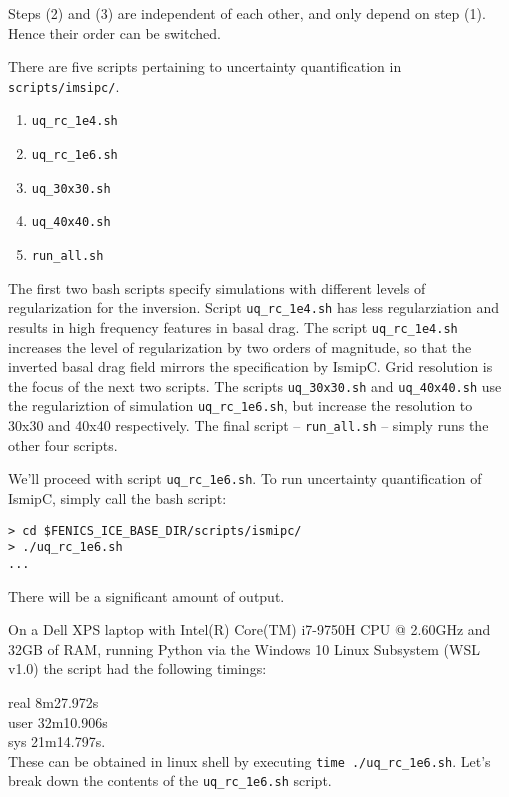 \documentclass[11pt, reqno, nocenter]{article}
\begin{document}
Steps (2) and (3) are independent of each other, and only depend on step (1). Hence their order can be switched.

There are five scripts pertaining to uncertainty quantification in {\tt scripts/imsipc/}.
\begin{enumerate}
	\item {\tt uq\_rc\_1e4.sh  }
	\item {\tt uq\_rc\_1e6.sh}
	\item {\tt uq\_30x30.sh  }
	\item {\tt uq\_40x40.sh  }
	\item {\tt run\_all.sh}  
\end{enumerate}

The first two bash scripts specify simulations with different levels of regularization for the inversion. Script {\tt uq\_rc\_1e4.sh} has less regularziation and results in high frequency features in basal drag. The script {\tt uq\_rc\_1e4.sh} increases the level of regularization by two orders of magnitude, so that the inverted basal drag field mirrors the specification by IsmipC. Grid resolution is the focus of the next two scripts. The scripts {\tt uq\_30x30.sh} and {\tt uq\_40x40.sh} use the regulariztion of simulation {\tt uq\_rc\_1e6.sh}, but increase the resolution to 30x30 and 40x40 respectively. The final script -- {\tt run\_all.sh}  -- simply runs the other four scripts.

We'll proceed with script {\tt uq\_rc\_1e6.sh}. To run uncertainty quantification of IsmipC, simply call the bash script:
\begin{verbatim}
> cd $FENICS_ICE_BASE_DIR/scripts/ismipc/
> ./uq_rc_1e6.sh
...
\end{verbatim}

There will be a significant amount of output. 

On a Dell XPS laptop with Intel(R) Core(TM) i7-9750H CPU @ 2.60GHz and 32GB of RAM, running Python via the Windows 10 Linux Subsystem (WSL v1.0) the script had the following timings:   

real	\hspace{10mm} 8m27.972s \\
user  \hspace{9mm}  32m10.906s \\
sys    \hspace{11mm} 21m14.797s. \\

These can be obtained in linux shell by executing {\tt time ./uq\_rc\_1e6.sh}. Let's break down the contents of the {\tt uq\_rc\_1e6.sh} script.
\end{document}
